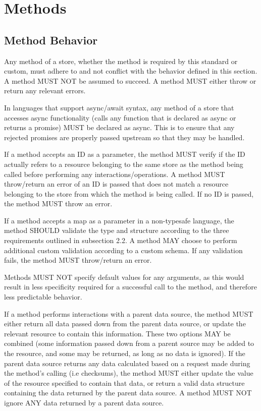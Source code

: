 \documentclass{article}
\begin{document}
\section{Methods}

\subsection{Method Behavior}
Any method of a store, whether the method is required by this standard or custom, must adhere to and not conflict with the behavior defined in this section. A method MUST NOT be assumed to succeed. A method MUST either throw or return any relevant errors.

In languages that support async/await syntax, any method of a store that accesses async functionality (calls any function that is declared as async or returns a promise) MUST be declared as async. This is to ensure that any rejected promises are properly passed upstream so that they may be handled.

If a method accepts an ID as a parameter, the method MUST verify if the ID actually refers to a resource belonging to the same store as the method being called before performing any interactions/operations. A method MUST throw/return an error of an ID is passed that does not match a resource belonging to the store from which the method is being called. If no ID is passed, the method MUST throw an error. 

If a method accepts a map as a parameter in a non-typesafe language, the method SHOULD validate the type and structure according to the three requirements outlined in subsection 2.2. A method MAY choose to perform additional custom validation according to a custom schema. If any validation fails, the method MUST throw/return an error.

Methods MUST NOT specify default values for any arguments, as this would result in less specificity required for a successful call to the method, and therefore less predictable behavior. 

If a method performs interactions with a parent data source, the method MUST either return all data passed down from the parent data source, or update the relevant resource to contain this information. These two options MAY be combined (some information passed down from a parent source may be added to the resource, and some may be returned, as long as no data is ignored). If the parent data source returns any data calculated based on a request made during the method's calling (i.e checksums), the method MUST either update the value of the resource specified to contain that data, or return a valid data structure containing the data returned by the parent data source. A method MUST NOT ignore ANY data returned by a parent data source.
\end{document}

